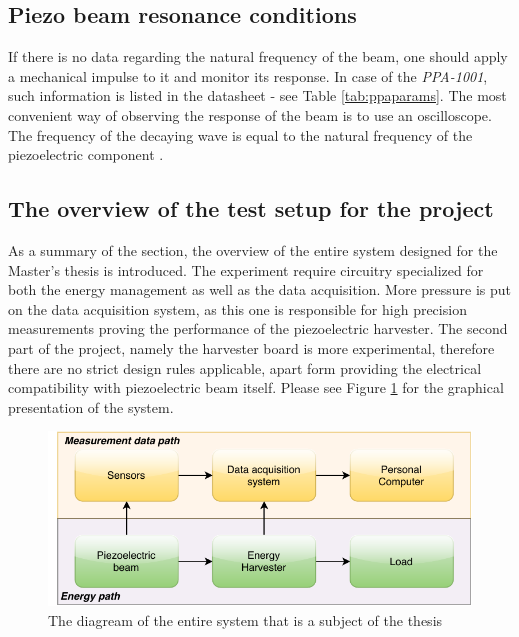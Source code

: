 \documentclass[12pt,a4paper]{article}
\begin{document}
\subsection{Piezo beam resonance conditions}

If there is no data regarding the natural frequency of the beam, one should apply a mechanical impulse to it and monitor its response. In case of the \textit{PPA-1001}, such information is listed in the datasheet \cite{PPA} - see Table \ref{tab:ppaparams}. The most convenient way of observing the response of the beam is to use an oscilloscope. The frequency of the decaying wave is equal to the natural frequency of the piezoelectric component \cite{PPA}.
\par

\subsection{The overview of the test setup for the project}

As a summary of the section, the overview of the entire system designed for the Master's thesis is introduced. The experiment require circuitry specialized for both the energy management as well as the data acquisition. More pressure is put on the data acquisition system, as this one is responsible for high precision measurements proving the performance of the piezoelectric harvester. The second part of the project, namely the harvester board is more experimental, therefore there are no strict design rules applicable, apart form providing the electrical compatibility with piezoelectric beam itself. Please see Figure \ref{fig:system} for the graphical presentation of the system.

\begin{figure}[h!]
\includegraphics[scale=1.0]{system.pdf}
\caption{The diagream of the entire system that is a subject of the thesis}
\label{fig:system}
\end{figure}
\par
\end{document}
